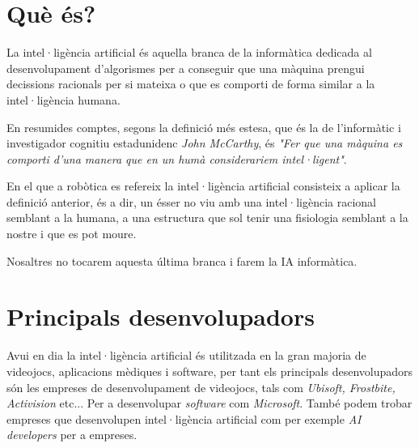 \section{Què és?}

La intel·ligència artificial és aquella branca de la informàtica dedicada al
desenvolupament d'algorismes per a conseguir que una màquina prengui decissions
 racionals per si mateixa o que es comporti de forma similar a la intel·ligència humana.

En resumides comptes, segons la definició més estesa, que és la de l'informàtic i
investigador cognitiu estadunidenc \emph{John McCarthy}, és \emph{"Fer que una màquina
es comporti d'una manera que en un humà considerariem intel·ligent"}.

En el que a robòtica es refereix la intel·ligència artificial consisteix a aplicar la
definició anterior, és a dir, un ésser no viu amb una intel·ligència racional semblant
a la humana, a una estructura que sol tenir una fisiologia semblant a la nostre i que
es pot moure.
\cite{definiciondeia} \cite{wikiia} \cite{monoia}

Nosaltres no tocarem aquesta última branca i farem la IA informàtica.

\section{Principals desenvolupadors}

Avui en dia la intel·ligència artificial és utilitzada en la gran majoria de videojocs,
aplicacions mèdiques i software, per tant els principals desenvolupadors són les
empreses de desenvolupament de videojocs, tals com \emph{Ubisoft, Frostbite, Activision}
etc... Per a desenvolupar \emph{software} com \emph{Microsoft}. També podem trobar
empreses que desenvolupen intel·ligència artificial com per exemple \emph{AI developers}
\cite{aidevelopers}per a empreses.





